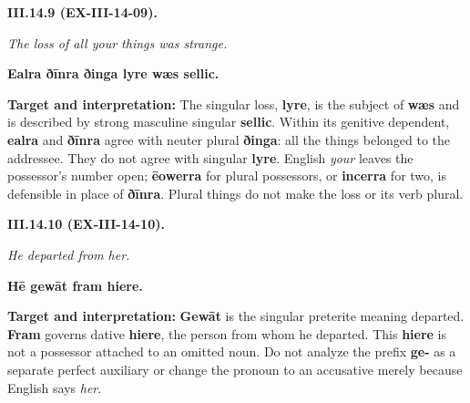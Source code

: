 \par\begin{minipage}{\linewidth}\raggedright
\textbf{III.14.9 (EX-III-14-09).}

\emph{The loss of all your things was strange.}

\textbf{Ealra ðīnra ðinga lyre wæs sellic.}

\textbf{Target and interpretation:} The singular loss, \textbf{lyre}, is the subject of \textbf{wæs} and is described by strong masculine singular \textbf{sellic}. Within its genitive dependent, \textbf{ealra} and \textbf{ðīnra} agree with neuter plural \textbf{ðinga}: all the things belonged to the addressee. They do not agree with singular \textbf{lyre}. English \emph{your} leaves the possessor's number open; \textbf{ēowerra} for plural possessors, or \textbf{incerra} for two, is defensible in place of \textbf{ðīnra}. Plural things do not make the loss or its verb plural.

\end{minipage}\par\addvspace{4pt}

\par\begin{minipage}{\linewidth}\raggedright
\textbf{III.14.10 (EX-III-14-10).}

\emph{He departed from her.}

\textbf{Hē gewāt fram hiere.}

\textbf{Target and interpretation:} \textbf{Gewāt} is the singular preterite meaning departed. \textbf{Fram} governs dative \textbf{hiere}, the person from whom he departed. This \textbf{hiere} is not a possessor attached to an omitted noun. Do not analyze the prefix \textbf{ge-} as a separate perfect auxiliary or change the pronoun to an accusative merely because English says \emph{her}.

\end{minipage}\par\addvspace{4pt}

